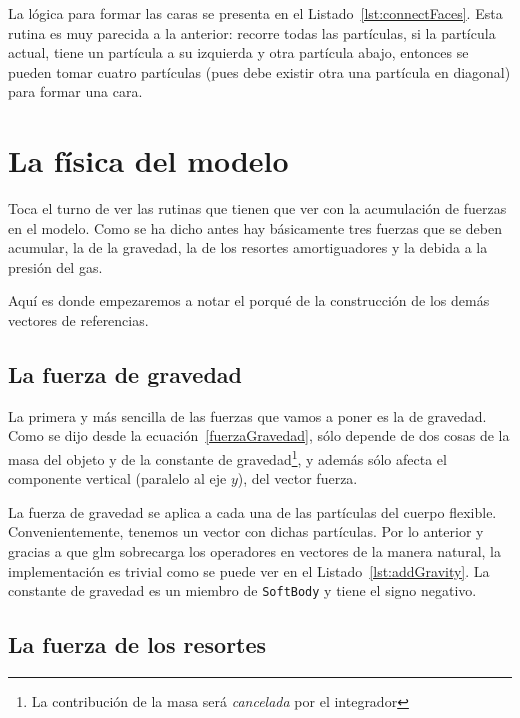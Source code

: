 La lógica para formar las caras se presenta en el Listado~\ref{lst:connectFaces}.
Esta rutina es muy parecida a la anterior: recorre todas las partículas, si la partícula actual, tiene un partícula a su izquierda y otra partícula abajo, entonces se pueden tomar cuatro partículas (pues debe existir otra una partícula en diagonal) para formar una cara.

\section{La física del modelo}
Toca el turno de ver las rutinas que tienen que ver con la acumulación de fuerzas en el modelo.
Como se ha dicho antes hay básicamente tres fuerzas que se deben acumular, la de la gravedad, la de los resortes amortiguadores y la debida a la presión del gas.

Aquí es donde empezaremos a notar el porqué de la construcción de los demás vectores de referencias.

\subsection{La fuerza de gravedad}
La primera y más sencilla de las fuerzas que vamos a poner es la de gravedad.
Como se dijo desde la ecuación~\eqref{fuerzaGravedad}, sólo depende de dos cosas de la masa del objeto y de la constante de gravedad\footnote{La contribución de la masa será \emph{cancelada} por el integrador}, y además sólo afecta el componente vertical (paralelo al eje $y$), del vector fuerza.

La fuerza de gravedad se aplica a cada una de las partículas del cuerpo flexible. 
Convenientemente, tenemos un vector con dichas partículas.
Por lo anterior y gracias a que glm sobrecarga los operadores en vectores de la manera natural, la implementación es trivial como se puede ver en el Listado~\ref{lst:addGravity}.
La constante de gravedad es un miembro de \texttt{SoftBody} y tiene el signo negativo.


\subsection{La fuerza de los resortes}

